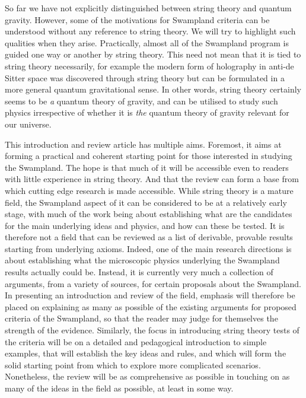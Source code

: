 \documentclass[11pt,a4paper]{article}
\numberwithin{equation}{section}
\numberwithin{table}{section}\setlength{\multlinegap}{25pt}
\begin{document}
So far we have not explicitly distinguished between string theory and quantum gravity. However, some of the motivations for Swampland criteria can be understood without any reference to string theory. We will try to highlight such qualities when they arise. Practically, almost all of the Swampland program is guided one way or another by string theory. This need not mean that it is tied to string theory necessarily, for example the modern form of holography in anti-de Sitter space was discovered through string theory but can be formulated in a more general quantum gravitational sense. In other words, string theory certainly seems to be {\it a} quantum theory of gravity, and can be utilised to study such physics irrespective of whether it is {\it the} quantum theory of gravity relevant for our universe.

This introduction and review article has multiple aims. Foremost, it aims at forming a practical and coherent starting point for those interested in studying the Swampland. The hope is that much of it will be accessible even to readers with little experience in string theory. And that the review can form a base from which cutting edge research is made accessible. While string theory is a mature field, the Swampland aspect of it can be considered to be at a relatively early stage, with much of the work being about establishing what are the candidates for the main underlying ideas and physics, and how can these be tested. It is therefore not a field that can be reviewed as a list of derivable, provable results starting from underlying axioms. Indeed, one of the main research directions is about establishing what the microscopic physics underlying the Swampland results actually could be. Instead, it is currently very much a collection of arguments, from a variety of sources, for certain proposals about the Swampland. In presenting an introduction and review of the field, emphasis will therefore be placed on explaining as many as possible of the existing arguments for proposed criteria of the Swampland, so that the reader may judge for themselves the strength of the evidence. Similarly, the focus in introducing string theory tests of the criteria will be on a detailed and pedagogical introduction to simple examples, that will establish the key ideas and rules, and which will form the solid starting point from which to explore more complicated scenarios. Nonetheless, the review will be as comprehensive as possible in touching on as many of the ideas in the field as possible, at least in some way. 
\end{document}
